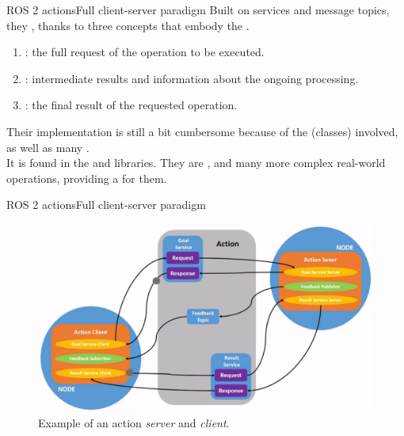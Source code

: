 \begin{frame}{ROS 2 actions}{Full client-server paradigm}
  Built on services and message topics, they , thanks to three concepts that embody the .
  \begin{enumerate}
    \item {}: the full request of the operation to be executed.
    \item {}: intermediate results and information about the ongoing processing.
    \item {}: the final result of the requested operation.
  \end{enumerate}
  \vspace{.5cm}
  Their implementation is still a bit cumbersome because of the  (classes) involved, as well as many .\\
  It is found in the \href{https://github.com/ros2/rclcpp/tree/jazzy/rclcpp_action}{} and \href{https://github.com/ros2/rclpy/tree/jazzy/rclpy/rclpy/action}{} libraries.
  \newline\newline
  They are , and many more complex real-world operations, providing a  for them.
\end{frame}
\begin{frame}{ROS 2 actions}{Full client-server paradigm}
  \begin{figure}
    \centering
    \includegraphics[scale=.37]{ros2Act.png}
    \caption{Example of an action \emph{server} and \emph{client}.}
    \label{fig:ros2Act}
  \end{figure}
\end{frame}
